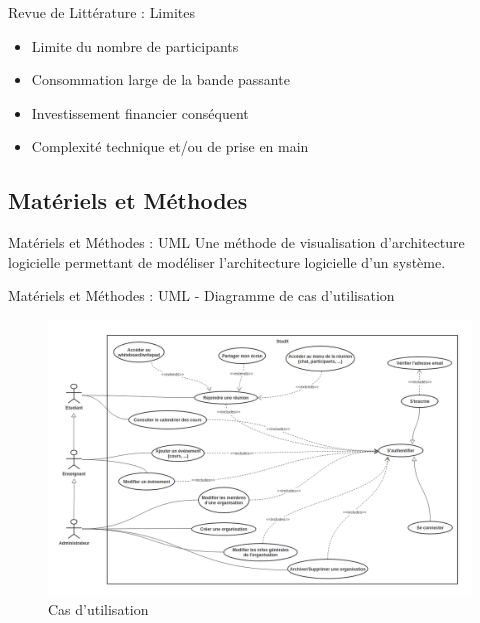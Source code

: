 \documentclass{beamer}
\begin{document}
\begin{frame}{Revue de Littérature : \small{Limites}}
  \begin{itemize}
    \item Limite du nombre de participants
    \item Consommation large de la bande passante
    \item Investissement financier conséquent
    \item Complexité technique et/ou de prise en main
  \end{itemize}
\end{frame}
\begin{frame}
  \begin{center}
    \section{\huge{Matériels et Méthodes}}
  \end{center}
\end{frame}

\begin{frame}{Matériels et Méthodes : \small{UML}}
  Une méthode de visualisation d’architecture logicielle permettant de modéliser l’architecture logicielle d’un système.
\end{frame}

\begin{frame}{Matériels et Méthodes : \small{UML} - \footnotesize{Diagramme de cas d'utilisation}}
  \begin{figure}[H]
    \centering
    \includegraphics[width=\textwidth]{../../images/use-cases-diag.png}
    \caption{Cas d'utilisation}
\end{figure}

\end{frame}
\end{document}
